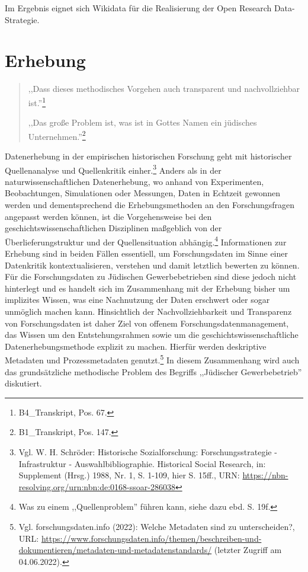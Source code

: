 Im Ergebnis eignet sich Wikidata für die Realisierung der Open Research Data-Strategie.

\section{Erhebung}

\begin{quote}
    ,,Dass dieses methodisches Vorgehen auch transparent und nachvollziehbar ist.''\footnote{B4\_Transkript, Pos. 67.}

    ,,Das große Problem ist, was ist in Gottes Namen ein jüdisches Unternehmen.''\footnote{B1\_Transkript, Pos. 147.}
\end{quote}

Datenerhebung in der empirischen historischen Forschung geht mit historischer Quellenanalyse und Quellenkritik einher.\footnote{Vgl. W. H. Schröder: Historische Sozialforschung: Forschungsstrategie - Infrastruktur - Auswahlbibliographie.
Historical Social Research, in: Supplement (Hrsg.) 1988, Nr. 1, S. 1-109, hier S. 15ff., URN: \url{https://nbn-resolving.org/urn:nbn:de:0168-ssoar-286038}
} Anders als in der naturwissenschaftlichen Datenerhebung, wo anhand von Experimenten, Beobachtungen, Simulationen oder Messungen, Daten in Echtzeit gewonnen werden und dementsprechend die Erhebungsmethoden an den Forschungsfragen angepasst werden können, ist die Vorgehensweise bei den geschichtswissenschaftlichen Disziplinen maßgeblich von der Überlieferungstruktur und der Quellensituation abhängig.\footnote{Was zu einem ,,Quellenproblem'' führen kann, siehe dazu ebd. S. 19f.} Informationen zur Erhebung sind in beiden Fällen essentiell, um Forschungsdaten im Sinne einer Datenkritik kontextualisieren, verstehen und damit letztlich bewerten zu können. Für die Forschungsdaten zu Jüdischen Gewerbebetrieben sind diese jedoch nicht hinterlegt und es handelt sich im Zusammenhang mit der Erhebung bisher um implizites Wissen, was eine Nachnutzung der Daten erschwert oder sogar unmöglich machen kann. Hinsichtlich der Nachvollziehbarkeit und Transparenz von Forschungsdaten ist daher Ziel von offenem Forschungsdatenmanagement, das Wissen um den Entstehungsrahmen sowie um die geschichtswissenschaftliche Datenerhebungsmethode explizit zu machen. Hierfür werden deskriptive Metadaten und Prozessmetadaten genutzt.\footnote{Vgl. forschungsdaten.info (2022): Welche Metadaten sind zu unterscheiden?, URL: \url{https://www.forschungsdaten.info/themen/beschreiben-und-dokumentieren/metadaten-und-metadatenstandards/} (letzter Zugriff am 04.06.2022).} In diesem Zusammenhang wird auch das grundsätzliche methodische Problem des Begriffs ,,Jüdischer Gewerbebetrieb'' diskutiert.

